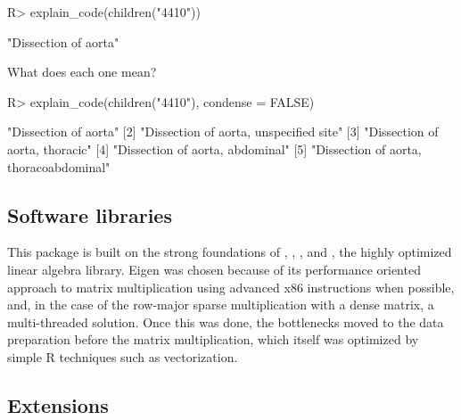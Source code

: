 \documentclass[article]{jss}
\begin{document}
\begin{CodeChunk}

\begin{CodeInput}
R> explain_code(children("4410"))
\end{CodeInput}

\begin{CodeOutput}
[1] "Dissection of aorta"
\end{CodeOutput}
\end{CodeChunk}

What does each one mean?

\begin{CodeChunk}

\begin{CodeInput}
R> explain_code(children("4410"), condense = FALSE)
\end{CodeInput}

\begin{CodeOutput}
[1] "Dissection of aorta"                  
[2] "Dissection of aorta, unspecified site"
[3] "Dissection of aorta, thoracic"        
[4] "Dissection of aorta, abdominal"       
[5] "Dissection of aorta, thoracoabdominal"
\end{CodeOutput}
\end{CodeChunk}

\hypertarget{software-libraries}{%
\subsection{Software libraries}\label{software-libraries}}

This package is built on the strong foundations of 
\citep{R_2018}, 
\citep{Eddelbuettel_RcppSeamlessIntegration_2011}, 
\citep{Eddelbeuttel_FastElegantNumerical_2013}, and 
\citep*{Guennebaud_Eigen_2017}, the highly optimized 
linear algebra library. Eigen was chosen because of its performance
oriented approach to matrix multiplication using advanced x86
instructions when possible, and, in the case of the row-major sparse
multiplication with a dense matrix, a multi-threaded solution. Once this
was done, the bottlenecks moved to the data preparation before the
matrix multiplication, which itself was optimized by simple R techniques
such as vectorization.

\hypertarget{extensions}{%
\subsection{Extensions}\label{extensions}}
\end{document}
